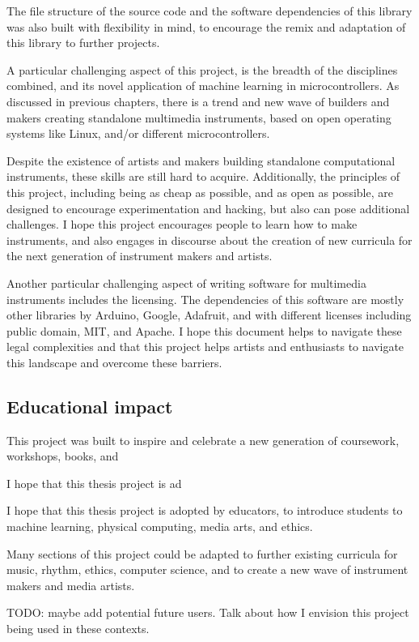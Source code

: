 The file structure of the source code and the software dependencies of this library was also built with flexibility in mind, to encourage the remix and adaptation of this library to further projects.

A particular challenging aspect of this project, is the breadth of the disciplines combined, and its novel application of machine learning in microcontrollers. As discussed in previous chapters, there is a trend and new wave of builders and makers creating standalone multimedia instruments, based on open operating systems like Linux, and/or different microcontrollers. 

Despite the existence of artists and makers building standalone computational instruments, these skills are still hard to acquire. Additionally, the principles of this project, including being as cheap as possible, and as open as possible, are designed to encourage experimentation and hacking, but also can pose additional challenges. I hope this project encourages people to learn how to make instruments, and also engages in discourse about the creation of new curricula for the next generation of instrument makers and artists.

Another particular challenging aspect of writing software for multimedia instruments includes the licensing. The dependencies of this software are mostly other libraries by Arduino, Google, Adafruit, and with different licenses including public domain, MIT, and Apache. I hope this document helps to navigate these legal complexities and that this project helps artists and enthusiasts to navigate this landscape and overcome these barriers.

\subsection{Educational impact}

This project was built to inspire and celebrate a new generation of coursework, workshops, books, and 

I hope that this thesis project is ad

I hope that this thesis project is adopted by educators, to introduce students to machine learning, physical computing, media arts, and ethics.

Many sections of this project could be adapted to further existing curricula for music, rhythm, ethics, computer science, and to create a new wave of instrument makers and media artists.

TODO: maybe add potential future users. Talk about how I envision this project being used in these contexts.

